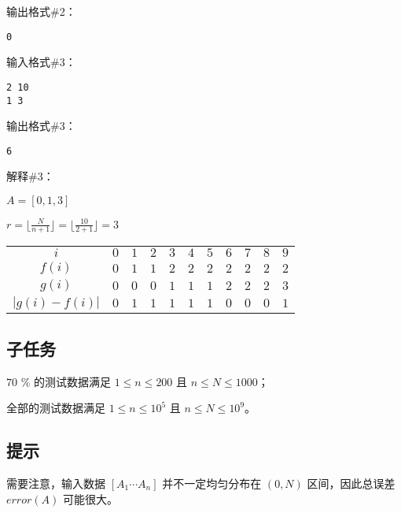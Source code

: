 输出格式\#2：

\begin{lstlisting}
0
\end{lstlisting}

输入格式\#3：

\begin{lstlisting}
2 10
1 3
\end{lstlisting}

输出格式\#3：

\begin{lstlisting}
6
\end{lstlisting}

解释\#3：

$A=[0, 1, 3]$

$r = \lfloor \frac{N}{n+1}\rfloor=\lfloor \frac{10}{2+1}\rfloor=3$

\begin{table}[H]
  \centering
  \begin{tabular}{ccccccccccc}
    \toprule
    $i$ & $0$ & $1$ & $2$ & $3$ & $4$ & $5$ & $6$ & $7$ & $8$ & $9$ \\
    $f(i)$ & $0$ & $1$ & $1$ & $2$ & $2$ & $2$ & $2$ & $2$ & $2$ & $2$ \\
    $g(i)$ & $0$ & $0$ & $0$ & $1$ & $1$ & $1$ & $2$ & $2$ & $2$ & $3$ \\
    $|g(i)-f(i)|$ & $0$ & $1$ & $1$ & $1$ & $1$ & $1$ & $0$ & $0$ & $0$ & $1$ \\
    \bottomrule
  \end{tabular}
\end{table}

\subsection*{子任务}

$70$ \% 的测试数据满足 $1\le n\le 200$ 且 $n\le N\le 1000$；

全部的测试数据满足 $1\le n\le 10^5$ 且 $n\le N\le 10^9$。

\subsection*{提示}

需要注意，输入数据 $[A_1\cdots A_n]$
 并不一定均匀分布在 $(0,N)$ 区间，因此总误差 $error(A)$ 可能很大。
